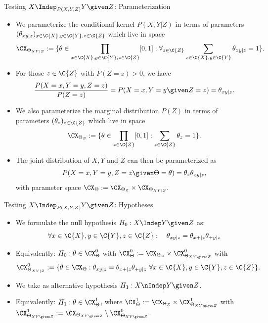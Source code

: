 \begin{frame}{Testing $X \Indep_{P(X,Y,Z)} Y \given Z$: Parameterization}
  \begin{itemize}
    \item We parameterize the conditional kernel $P(X,Y | Z)$ in terms of parameters
$(\theta_{xy|z})_{x\in\C{X},y\in\C{Y},z\in\C{Z}}$ which live in space
      $$\CX_{\Theta_{XY|Z}} := %
\{ \theta \in \prod_{x\in\C{X},y\in\C{Y},z\in\C{Z}} [0,1] : \forall_{z\in\C{Z}} \sum_{x\in\C{X},y\in\C{Y}} \theta_{xy|z} = 1\}.$$
\item For those $z\in\C{Z}$ with $P(Z = z) > 0$, we have 
$$\frac{P(X = x, Y = y, Z = z)}{P(Z=z)} = P(X = x, Y = y \given Z=z) = \theta_{xy|z}.$$
\item We also parameterize the marginal distribution $P(Z)$ in terms of parameters
$(\theta_z)_{z\in\C{Z}}$ which live in space
      $$\CX_{\Theta_Z} := \{ \theta \in \prod_{z\in\C{Z}} [0,1] : \sum_{z\in\C{Z}} \theta_z = 1\}.$$
\item The joint distribution of $X,Y$ and $Z$ can then be parameterized as
$$P(X=x,Y=y,Z=z \given \Theta=\theta) = \theta_z \theta_{xy|z},$$
      with parameter space $\CX_\Theta := \CX_{\Theta_Z} \times \CX_{\Theta_{XY|Z}}.$
  \end{itemize}
\end{frame}

\begin{frame}{Testing $X \Indep_{P(X,Y,Z)} Y \given Z$: Hypotheses}
  \begin{itemize}
    \item We formulate the null hypothesis $H_0 : X \Indep Y \given Z$ as:
$$\forall x \in \C{X}, y \in \C{Y}, z \in \C{Z}: \quad \theta_{xy|z} = \theta_{x+|z} \theta_{+ y|z}$$
    \item Equivalently: $H_0 : \theta \in \CX_\Theta^0$ with $\CX_\Theta^0 := \CX_{\Theta_Z} \times \CX_{\Theta_{XY\given Z}}^0$ with
      $$\CX_{\Theta_{XY|Z}}^0 := \{\theta \in \CX_\Theta : \theta_{xy|z} = \theta_{x+|z} \theta_{+ y|z}\ \forall x \in \C{X}, y \in \C{Y}, z \in \C{Z}\}.$$
    \item We take as alternative hypothesis $H_1 : X \nIndep Y \given Z$.
    \item Equivalently: $H_1 : \theta \in \CX_\Theta^1$, where
      $\CX_\Theta^1 := \CX_{\Theta_Z} \times \CX_{\Theta_{XY\given Z}}^1$ with $\CX_{\Theta_{XY\given Z}}^1 := \CX_{\Theta_{XY\given Z}} \setminus \CX_{\Theta_{XY\given Z}}^0$.
  \end{itemize}
\end{frame}

